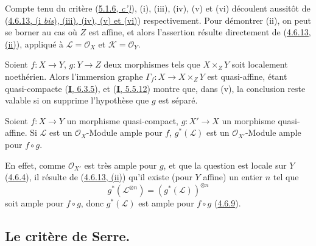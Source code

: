 Compte tenu du critère (\hyperref[II.5.1.6-fr]{5.1.6, \emph{c')}}), (i), (iii),
(iv), (v) et (vi) découlent aussitôt de
(\hyperref[II.4.6.13-fr]{4.6.13, (i \emph{bis}), (iii), (iv), (v) et (vi)})
respectivement. Pour démontrer (ii), on peut se borner au cas où $Z$ est
affine, et alors l'assertion résulte directement de
(\hyperref[II.4.6.13-fr]{4.6.13, (ii)}), appliqué à
$\mathcal{L}=\mathcal{O}_X$ et $\mathcal{K}=\mathcal{O}_Y$.

\begin{remark}[5.1.11]
\label{II.5.1.11-fr}
Soient $f:X\to Y$, $g:Y\to Z$ deux morphismes tels que $X\times_ZY$ soit
localement noethérien. Alors l'immersion graphe
$\Gamma_f:X\to X\times_ZY$ est quasi-affine, étant quasi-compacte
(\hyperref[I.6.3.5-fr]{\textbf{I}, 6.3.5}), et
(\hyperref[I.5.5.12-fr]{\textbf{I}, 5.5.12}) montre que, dans (v), la conclusion reste
valable si on supprime l'hypothèse que $g$ est séparé.
\end{remark}

\begin{proposition}[5.1.12]
\label{II.5.1.12-fr}
Soient $f:X\to Y$ un morphisme quasi-compact, $g:X'\to X$ un morphisme
quasi-affine. Si $\mathcal{L}$ est un $\mathcal{O}_X$-Module ample pour
$f$, $g^*(\mathcal{L})$ est un $\mathcal{O}_{X'}$-Module ample pour
$f\circ g$.
\end{proposition}

En effet, comme $\mathcal{O}_{X'}$ est très ample pour $g$, et que la
question est locale sur $Y$ (\hyperref[II.4.6.4-fr]{4.6.4}), il résulte de
(\hyperref[II.4.6.13-fr]{4.6.13, (ii)}) qu'il existe (pour $Y$ affine) un
entier $n$ tel que
\[
  g^*(\mathcal{L}^{\otimes n})=(g^*(\mathcal{L}))^{\otimes n}
\]
soit ample pour
$f\circ g$, donc $g^*(\mathcal{L})$ est ample pour $f\circ g$
(\hyperref[II.4.6.9-fr]{4.6.9}).


\subsection{Le critère de Serre.}
\label{subsection:II.5.2-fr}

